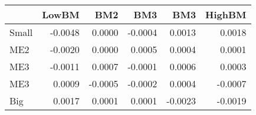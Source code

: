 \begin{tabular}{lrrrrr}
\toprule
{} &   LowBM &     BM2 &     BM3 &     BM3 &  HighBM \\
\midrule
Small & -0.0048 &  0.0000 & -0.0004 &  0.0013 &  0.0018 \\
ME2   & -0.0020 &  0.0000 &  0.0005 &  0.0004 &  0.0001 \\
ME3   & -0.0011 &  0.0007 & -0.0001 &  0.0006 &  0.0003 \\
ME3   &  0.0009 & -0.0005 & -0.0002 &  0.0004 & -0.0007 \\
Big   &  0.0017 &  0.0001 &  0.0001 & -0.0023 & -0.0019 \\
\bottomrule
\end{tabular}
